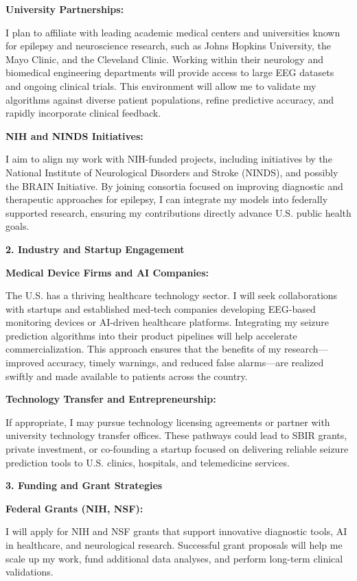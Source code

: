 \documentclass{article}
\begin{document}
{\bf University Partnerships: }

I plan to affiliate with leading academic medical centers and universities known for epilepsy and neuroscience research, such as Johns Hopkins University, the Mayo Clinic, and the Cleveland Clinic. Working within their neurology and biomedical engineering departments will provide access to large EEG datasets and ongoing clinical trials. This environment will allow me to validate my algorithms against diverse patient populations, refine predictive accuracy, and rapidly incorporate clinical feedback.

{\bf NIH and NINDS Initiatives: }

I aim to align my work with NIH-funded projects, including initiatives by the National Institute of Neurological Disorders and Stroke (NINDS), and possibly the BRAIN Initiative. By joining consortia focused on improving diagnostic and therapeutic approaches for epilepsy, I can integrate my models into federally supported research, ensuring my contributions directly advance U.S. public health goals.

{\bf 2. Industry and Startup Engagement }

{\bf Medical Device Firms and AI Companies: }

The U.S. has a thriving healthcare technology sector. I will seek collaborations with startups and established med-tech companies developing EEG-based monitoring devices or AI-driven healthcare platforms. Integrating my seizure prediction algorithms into their product pipelines will help accelerate commercialization. This approach ensures that the benefits of my research—improved accuracy, timely warnings, and reduced false alarms—are realized swiftly and made available to patients across the country.

{\bf Technology Transfer and Entrepreneurship: } 

If appropriate, I may pursue technology licensing agreements or partner with university technology transfer offices. These pathways could lead to SBIR grants, private investment, or co-founding a startup focused on delivering reliable seizure prediction tools to U.S. clinics, hospitals, and telemedicine services.

{\bf 3. Funding and Grant Strategies }

{\bf Federal Grants (NIH, NSF): }

I will apply for NIH and NSF grants that support innovative diagnostic tools, AI in healthcare, and neurological research. Successful grant proposals will help me scale up my work, fund additional data analyses, and perform long-term clinical validations.
\end{document}
